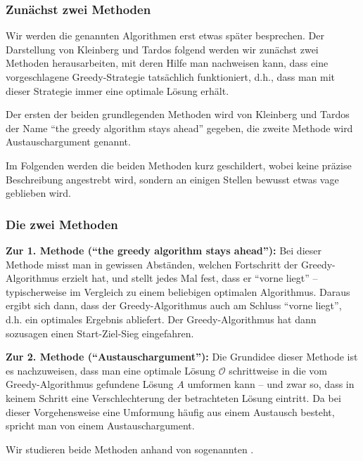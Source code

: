 \documentclass[smaller]{beamer}
\begin{document}
\begin{frame}
 \frametitle{Zunächst zwei Methoden}
 Wir werden die genannten Algorithmen erst etwas später besprechen. Der Darstellung von Kleinberg und Tardos folgend werden wir zunächst \alert{zwei Methoden} herausarbeiten, mit deren Hilfe man nachweisen kann, dass eine vorgeschlagene Greedy-Strategie tatsächlich funktioniert, d.h., dass man mit dieser Strategie immer eine optimale Lösung erhält. \\ \vspace*{0.2cm}
 
 Der ersten der beiden grundlegenden Methoden wird von Kleinberg und Tardos der Name \alert{\foreignquote{english}{the greedy algorithm stays ahead}} gegeben, die zweite Methode wird \alert{Austauschargument} genannt. \\ \vspace*{0.2cm}

 Im Folgenden werden die beiden Methoden kurz geschildert, wobei keine präzise Beschreibung angestrebt wird, sondern an einigen Stellen bewusst etwas vage geblieben wird. 
\end{frame}

\begin{frame}
\frametitle{Die zwei Methoden}
 
\textbf{Zur 1. Methode (\foreignquote{english}{the greedy algorithm stays ahead}):} Bei dieser Methode misst man in gewissen Ab\-ständen, welchen Fortschritt der Greedy-Algorithmus erzielt hat, und stellt jedes Mal fest, dass er \enquote{vorne liegt} -- typischerweise im Vergleich zu einem beliebigen optimalen Algorithmus. Daraus ergibt sich dann, dass der Greedy-Algorithmus auch am Schluss \enquote{vorne liegt}, d.h. ein optimales Ergebnis abliefert. Der Greedy-Algorithmus hat dann sozusagen einen Start-Ziel-Sieg eingefahren. \\ \vspace*{0.2cm}

\textbf{Zur 2. Methode (\enquote{Austauschargument}):} Die Grundidee dieser Methode ist es nachzuweisen, dass man eine optimale Lösung $\mathcal{O}$ schrittweise in die vom Greedy-Algorithmus gefundene Lösung $A$ umformen kann -- und zwar so, dass in keinem Schritt eine Verschlechterung der betrachteten Lösung eintritt. Da bei dieser Vorgehensweise eine Umformung häufig aus einem Austausch besteht, spricht man von einem \alert{Austauschargument}. \\ \vspace*{0.2cm}

Wir studieren beide Methoden anhand von sogenannten .
\end{frame}
\end{document}
